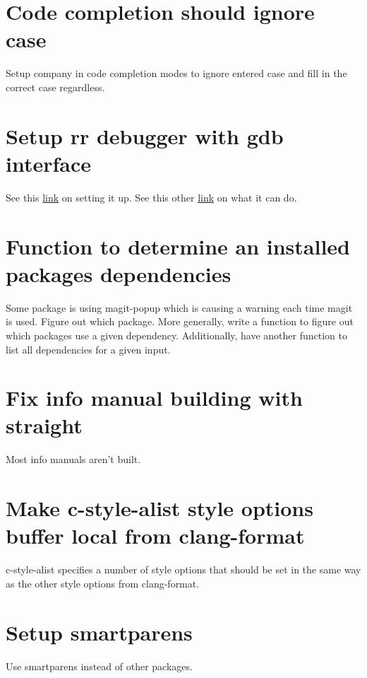 \documentclass{default}
\begin{document}
\section{Code completion should ignore case}

Setup company in code completion modes to ignore entered case and fill in the correct case
regardless.

\section{Setup rr debugger with gdb interface}

See this
\href{https://emacs.stackexchange.com/questions/20056/is-it-possible-to-use-mozillas-rr-with-gdb-multi-window?rq=1}{link}
on setting it up. See this other
\href{http://fitzgeraldnick.com/2015/11/02/back-to-the-futurre.html}{link} on what it can do.

\section{Function to determine an installed packages dependencies}

Some package is using magit-popup which is causing a warning each time magit is used. Figure out
which package. More generally, write a function to figure out which packages use a given
dependency. Additionally, have another function to list all dependencies for a given input.

\section{Fix info manual building with straight}

Most info manuals aren't built.

\section{Make c-style-alist style options buffer local from clang-format}

c-style-alist specifies a number of style options that should be set in the same way as the other
style options from clang-format.

\section{Setup smartparens}

Use smartparens instead of other packages.
\end{document}
